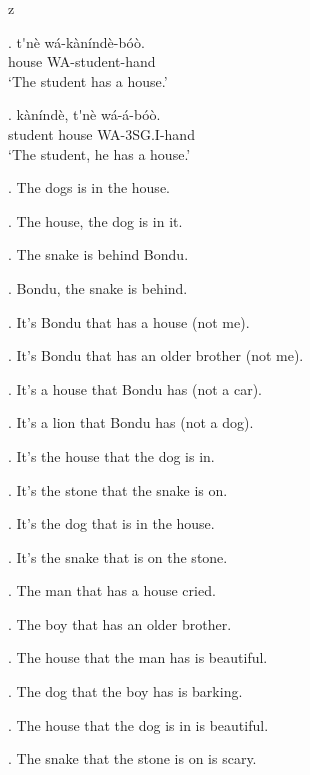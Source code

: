 z   \documentclass{assets/fieldnotes}
\begin{document}
\exg. t\'{}n\`{e} w\'{a}-k\`{a}n\'{i}nd\`{e}-b\'{o}\`{o}. \\
house WA-student-hand \\
`The student has a house.'

\exg. k\`{a}n\'{i}nd\`{e}, t\'{}n\`{e} w\'{a}-\'{a}-b\'{o}\`{o}. \\
student house WA-3SG.I-hand \\
`The student, he has a house.' 

\ex. The dogs is in the house. 

\ex. The house, the dog is in it. 

\ex. The snake is behind Bondu. 

\ex. Bondu, the snake is behind. 


\ex. It's Bondu that has a house (not me). 

\ex. It's Bondu that has an older brother (not me). 

\ex. It's a house that Bondu has (not a car). 

\ex. It's a lion that Bondu has (not a dog). 

\ex. It's the house that the dog is in. 

\ex. It's the stone that the snake is on. 

\ex. It's the dog that is in the house. 

\ex. It's the snake that is on the stone.  


\ex. The man that has a house cried. 

\ex. The boy that has an older brother. 

\ex. The house that the man has is beautiful. 

\ex. The dog that the boy has is barking. 

\ex. The house that the dog is in is beautiful. 

\ex. The snake that the stone is on is scary. 
\end{document}

